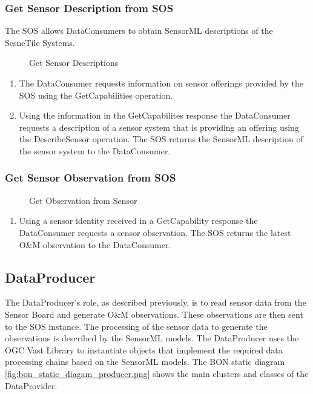 \documentclass[]{final_report}
\begin{document}
\subsubsection{Get Sensor Description from SOS}
The SOS allows DataConsumers to obtain SensorML descriptions of the SesneTile Systems.
\begin{figure}[h]
\centering
{}
\caption{Get Sensor Descriptions}\label{fig:GetMeta}
\end{figure}
 \begin{enumerate}
\item The DataConsumer requests information on sensor offerings provided by the SOS using the GetCapabilities operation.
\item Using the information in the GetCapabilites response the DataConsumer requests a description of a sensor system that is providing an offering using the DescribeSensor operation. The SOS returns the SensorML description of the sensor system to the DataConsumer.
\end{enumerate}

\subsubsection{Get  Sensor Observation from SOS}
\begin{figure}[h]
\centering
{}
\caption{Get Observation from Sensor}\label{fig:GetObs}
\end{figure}
 \begin{enumerate}
\item Using a sensor identity received in a GetCapability response the DataConsumer requests a sensor observation. The SOS returns the latest O\&M observation to the DataConsumer.
\end{enumerate}




\newpage
\subsection{DataProducer}\label{DataProducerHigh}
The DataProducer's role, as described previously, is to read sensor data from the Sensor Board and generate O\&M observations. These observations are then sent to the SOS instance. The processing of the sensor data to generate the observations is described by the SensorML models. The DataProducer uses the OGC Vast Library to instantiate objects that implement the required data processing chains based on the SensorML models. The BON static diagram \ref{fig:bon_static_diagam_producer.png}
 shows the main clusters and classes of the DataProvider.
\end{document}
